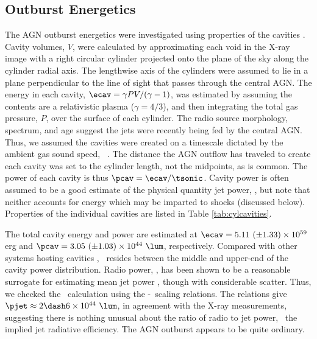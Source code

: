 \documentclass[useAMS,usenatbib]{mn2e}
\begin{document}
\subsection{Outburst Energetics}

The AGN outburst energetics were investigated using properties of the
cavities \citep[see][for a review]{mcnamrev}. Cavity volumes, $V$,
were calculated by approximating each void in the X-ray image with a
right circular cylinder projected onto the plane of the sky along the
cylinder radial axis. The lengthwise axis of the cylinders were
assumed to lie in a plane perpendicular to the line of sight that
passes through the central AGN. The energy in each cavity, $\ecav =
\gamma PV/(\gamma-1)$, was estimated by assuming the contents are a
relativistic plasma ($\gamma = 4/3$), and then integrating the total
gas pressure, $P$, over the surface of each cylinder. The radio source
morphology, spectrum, and age suggest the jets were recently being fed
by the central AGN. Thus, we assumed the cavities were created on a
timescale dictated by the ambient gas sound speed,
\tsonic\ \citep[see][]{birzan04}. The distance the AGN outflow has
traveled to create each cavity was set to the cylinder length, not the
midpoints, as is common. The power of each cavity is thus $\pcav =
\ecav/\tsonic$. Cavity power is often assumed to be a good estimate of
the physical quantity jet power, \pjet, but note that neither accounts
for energy which may be imparted to shocks (discussed
below). Properties of the individual cavities are listed in Table
\ref{tab:cylcavities}.

The total cavity energy and power are estimated at $\ecav = 5.11 ~(\pm
1.33) \times 10^{59}$ erg and $\pcav = 3.05 ~(\pm 1.03) \times 10^{44}
~\lum$, respectively. Compared with other systems hosting cavities
\citep[\eg][]{birzan04, dunn08}, \irs\ resides between the middle and
upper-end of the cavity power distribution. Radio power, \prad, has
been shown to be a reasonable surrogate for estimating mean jet power
\citep{birzan08}, though with considerable scatter. Thus, we checked
the \pcav\ calculation using the \citet{pjet} \pjet-\prad\ scaling
relations. The relations give $\pjet \approx 2 \dash 6 \times 10^{44}
~\lum$, in agreement with the X-ray measurements, suggesting there is
nothing unusual about the ratio of radio to jet power, \ie\ the
implied jet radiative efficiency. The AGN outburst appears to be quite
ordinary.
\end{document}
